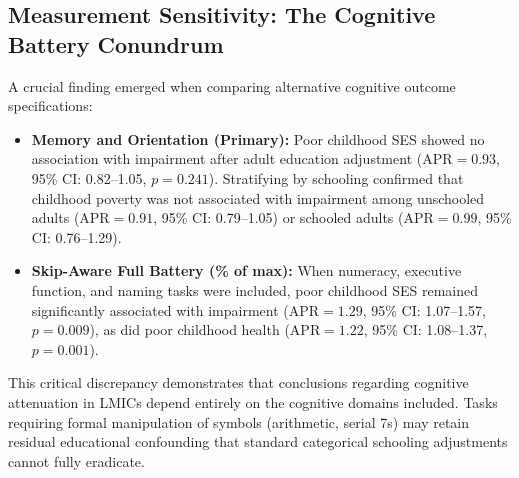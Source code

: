 \documentclass[11pt,a4paper]{article}
\begin{document}
\begin{table}[H]
\centering
\small
\caption{\textbf{Comparison of Complete-Case vs. IPW-Adjusted Model 2 Cognitive Estimates.}}
\label{tab:ipw}
\end{table}

\subsection{Measurement Sensitivity: The Cognitive Battery Conundrum}
A crucial finding emerged when comparing alternative cognitive outcome specifications:
\begin{itemize}
    \item \textbf{Memory and Orientation (Primary):} Poor childhood SES showed no association with impairment after adult education adjustment ($\text{APR} = 0.93$, 95\% CI: 0.82--1.05, $p = 0.241$). Stratifying by schooling confirmed that childhood poverty was not associated with impairment among unschooled adults ($\text{APR} = 0.91$, 95\% CI: 0.79--1.05) or schooled adults ($\text{APR} = 0.99$, 95\% CI: 0.76--1.29).
    \item \textbf{Skip-Aware Full Battery (\% of max):} When numeracy, executive function, and naming tasks were included, poor childhood SES remained significantly associated with impairment ($\text{APR} = 1.29$, 95\% CI: 1.07--1.57, $p = 0.009$), as did poor childhood health ($\text{APR} = 1.22$, 95\% CI: 1.08--1.37, $p = 0.001$).
\end{itemize}
This critical discrepancy demonstrates that conclusions regarding cognitive attenuation in LMICs depend entirely on the cognitive domains included. Tasks requiring formal manipulation of symbols (arithmetic, serial 7s) may retain residual educational confounding that standard categorical schooling adjustments cannot fully eradicate.
\end{document}
